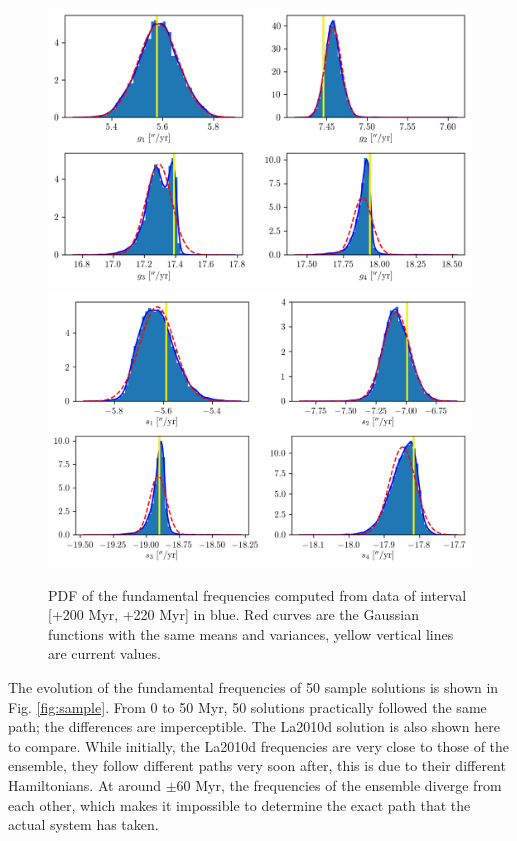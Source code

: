 \documentclass[12pt]{article}
\begin{document}
	\begin{figure}
		\centering
		\includegraphics[scale=0.85,center]{figures/PDF_g_210_+}
		\includegraphics[scale=0.85,center]{figures/PDF_s_210_+}    
		\caption{PDF of the fundamental frequencies computed from data of interval [+200 Myr, +220 Myr] in blue. Red curves are the Gaussian functions with the same means and variances, yellow vertical lines are current values.}
		\label{fig:future}
	\end{figure}
	The evolution of the fundamental frequencies of 50 sample solutions is shown in Fig. \ref{fig:sample}. From 0 to 50 Myr, 50 solutions practically followed the same path; the differences are imperceptible. 
	The La2010d solution is also shown here to compare. While initially, the La2010d frequencies are very close to those of the ensemble, they follow different paths very soon after, this is due to their different Hamiltonians. At around $\pm 60 $ Myr, the frequencies of the ensemble diverge from each other, which makes it impossible to determine the exact path that the actual system has taken.
\end{document}
